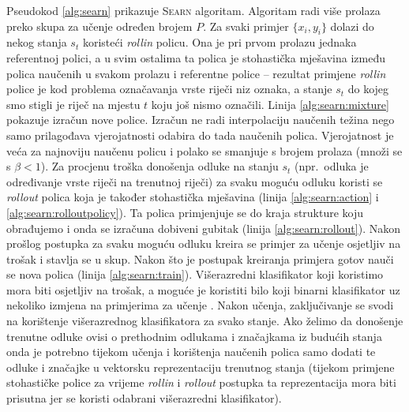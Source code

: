 Pseudokod \ref{alg:searn} prikazuje \textsc{Searn} algoritam. Algoritam radi
više prolaza preko skupa za učenje određen brojem $P$. Za svaki primjer $\{x_i,
y_i\}$ dolazi do nekog stanja $s_t$ koristeći \textit{rollin} policu. Ona je pri
prvom prolazu jednaka referentnoj polici, a u svim ostalima ta polica je
stohastička mješavina između polica naučenih u svakom prolazu i referentne
police -- rezultat primjene \textit{rollin} police je kod problema označavanja
vrste riječi niz oznaka, a stanje $s_t$ do kojeg smo stigli je riječ na mjestu
$t$ koju još nismo označili. Linija \ref{alg:searn:mixture} pokazuje izračun
nove police. Izračun ne radi interpolaciju naučenih težina nego samo prilagođava
vjerojatnosti odabira do tada naučenih polica. Vjerojatnost je veća za najnoviju
naučenu policu i polako se smanjuje s brojem prolaza (množi se s $\beta < 1$).
Za procjenu troška donošenja odluke na stanju $s_t$ (npr.~odluka je određivanje
vrste riječi na trenutnoj riječi) za svaku moguću odluku koristi se
\textit{rollout} polica koja je također stohastička mješavina (linija
\ref{alg:searn:action} i \ref{alg:searn:rolloutpolicy}). Ta polica primjenjuje
se do kraja strukture koju obrađujemo i onda se izračuna dobiveni gubitak
(linija \ref{alg:searn:rollout}). Nakon prošlog postupka za svaku moguću odluku
kreira se primjer za učenje osjetljiv na trošak i stavlja se u skup. Nakon što
je postupak kreiranja primjera gotov nauči se nova polica (linija
\ref{alg:searn:train}). Višerazredni klasifikator koji koristimo mora biti
osjetljiv na trošak, a moguće je koristiti bilo koji binarni klasifikator uz
nekoliko izmjena na primjerima za učenje \citep{zadrozny2003cost,
beygelzimer2005weighted, beygelzimer2005error}. Nakon učenja, zaključivanje se
svodi na korištenje višerazrednog klasifikatora za svako stanje. Ako želimo da
donošenje trenutne odluke ovisi o prethodnim odlukama i značajkama iz budućih
stanja onda je potrebno tijekom učenja i korištenja naučenih polica samo dodati
te odluke i značajke u vektorsku reprezentaciju trenutnog stanja (tijekom
primjene stohastičke police za vrijeme \textit{rollin} i \textit{rollout}
postupka ta reprezentacija mora biti prisutna jer se koristi odabrani
višerazredni klasifikator).

